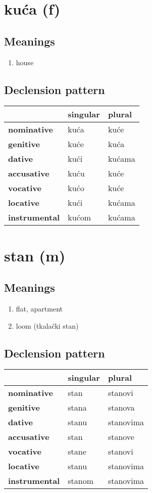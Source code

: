 \filbreak
\section{kuća (f)}
\subsection*{Meanings}
\begin{enumerate}
\item house
\end{enumerate}
\subsection*{Declension pattern}
\begin{tabularx}{\linewidth}{Xll}
\toprule
{} & singular &  plural \\
\midrule
\textbf{nominative  } &     kuća &    kuće \\
\textbf{genitive    } &     kuće &    kuća \\
\textbf{dative      } &     kući &  kućama \\
\textbf{accusative  } &     kuću &    kuće \\
\textbf{vocative    } &     kućo &    kuće \\
\textbf{locative    } &     kući &  kućama \\
\textbf{instrumental} &    kućom &  kućama \\
\bottomrule
\end{tabularx}

\filbreak
\section{stan (m)}
\subsection*{Meanings}
\begin{enumerate}
\item flat, apartment
\item loom (tkalački stan)
\end{enumerate}
\subsection*{Declension pattern}
\begin{tabularx}{\linewidth}{Xll}
\toprule
{} & singular &     plural \\
\midrule
\textbf{nominative  } &     stan &    stanovi \\
\textbf{genitive    } &    stana &    stanova \\
\textbf{dative      } &    stanu &  stanovima \\
\textbf{accusative  } &     stan &    stanove \\
\textbf{vocative    } &    stane &    stanovi \\
\textbf{locative    } &    stanu &  stanovima \\
\textbf{instrumental} &   stanom &  stanovima \\
\bottomrule
\end{tabularx}

